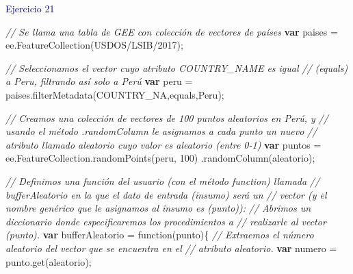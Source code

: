 \documentclass[
  12pt,
  letterpaper,
  twoside]{book}
\newenvironment{Shaded}{\begin{snugshade}}{\end{snugshade}}
\newcommand{\AttributeTok}[1]{\textcolor[rgb]{0.48,0.12,0.64}{#1}}
\newcommand{\CommentTok}[1]{\textcolor[rgb]{0.24,0.58,0.00}{\textit{#1}}}
\newcommand{\ControlFlowTok}[1]{\textcolor[rgb]{0.00,0.00,0.00}{\textbf{#1}}}
\newcommand{\DecValTok}[1]{\textcolor[rgb]{0.28,0.53,0.93}{#1}}
\newcommand{\FunctionTok}[1]{\textcolor[rgb]{0.48,0.12,0.64}{#1}}
\newcommand{\KeywordTok}[1]{\textcolor[rgb]{0.48,0.12,0.64}{#1}}
\newcommand{\NormalTok}[1]{#1}
\newcommand{\OperatorTok}[1]{\textcolor[rgb]{0.00,0.00,0.00}{#1}}
\newcommand{\StringTok}[1]{\textcolor[rgb]{0.87,0.29,0.22}{#1}}
\begin{document}
\textcolor{darkblue}{Ejercicio 21}

\begin{Shaded}
\begin{Highlighting}[]
\CommentTok{// Se llama una tabla de GEE con colección de vectores de países }
\ControlFlowTok{var}\NormalTok{ paises }\OperatorTok{=} \KeywordTok{ee}\OperatorTok{.}\FunctionTok{FeatureCollection}\NormalTok{(}\StringTok{\textquotesingle{}USDOS/LSIB/2017\textquotesingle{}}\NormalTok{)}\OperatorTok{;} 

\CommentTok{// Seleccionamos el vector cuyo atributo \textquotesingle{}COUNTRY\_NAME\textquotesingle{} es igual }
\CommentTok{// (\textquotesingle{}equals\textquotesingle{}) a \textquotesingle{}Peru\textquotesingle{}, filtrando así solo a Perú }
\ControlFlowTok{var}\NormalTok{ peru }\OperatorTok{=}\NormalTok{ paises}\OperatorTok{.}\FunctionTok{filterMetadata}\NormalTok{(}\StringTok{\textquotesingle{}COUNTRY\_NA\textquotesingle{}}\OperatorTok{,}\StringTok{\textquotesingle{}equals\textquotesingle{}}\OperatorTok{,}\StringTok{\textquotesingle{}Peru\textquotesingle{}}\NormalTok{)}\OperatorTok{;} 

\CommentTok{// Creamos una colección de vectores de 100 puntos aleatorios en Perú, y }
\CommentTok{// usando el método .randomColumn le asignamos a cada punto un nuevo }
\CommentTok{// atributo llamado \textquotesingle{}aleatorio\textquotesingle{} cuyo valor es aleatorio (entre 0{-}1)}
\ControlFlowTok{var}\NormalTok{ puntos }\OperatorTok{=} \KeywordTok{ee}\OperatorTok{.}\AttributeTok{FeatureCollection}\OperatorTok{.}\FunctionTok{randomPoints}\NormalTok{(peru}\OperatorTok{,} \DecValTok{100}\NormalTok{)}
  \OperatorTok{.}\FunctionTok{randomColumn}\NormalTok{(}\StringTok{\textquotesingle{}aleatorio\textquotesingle{}}\NormalTok{)}\OperatorTok{;}  

\CommentTok{// Definimos una función del usuario (con el método function) llamada }
\CommentTok{// \textquotesingle{}bufferAleatorio\textquotesingle{} en la que el dato de entrada (insumo) será un }
\CommentTok{// vector (y el nombre genérico que le asignamos al insumo es (punto)):}
\CommentTok{// Abrimos un diccionario donde especificaremos los procedimientos a }
\CommentTok{// realizarle al vector (punto).}
\ControlFlowTok{var}\NormalTok{ bufferAleatorio }\OperatorTok{=} \KeywordTok{function}\NormalTok{(punto)\{   }
  \CommentTok{// Extraemos el número aleatorio del vector que se encuentra en el }
  \CommentTok{// atributo \textquotesingle{}aleatorio\textquotesingle{}.}
  \ControlFlowTok{var}\NormalTok{ numero }\OperatorTok{=}\NormalTok{ punto}\OperatorTok{.}\FunctionTok{get}\NormalTok{(}\StringTok{\textquotesingle{}aleatorio\textquotesingle{}}\NormalTok{)}\OperatorTok{;}  
 

\end{Highlighting}
\end{Shaded}
\end{document}
